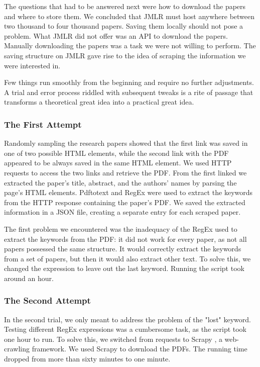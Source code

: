 The questions that had to be answered next were how to download the papers and where to store them. We concluded that JMLR must host anywhere between two thousand to four thousand papers. Saving them locally should not pose a problem. What JMLR did not offer was an API to download the papers. Manually downloading the papers was a task we were not willing to perform. The saving structure on JMLR gave rise to the idea of scraping the information we were interested in. 


Few things run smoothly from the beginning and require no further adjustments. A trial and error process riddled with subsequent tweaks is a rite of passage that transforms a theoretical great idea into a practical great idea.
\subsubsection{The First Attempt}
Randomly sampling the research papers showed that the first link was saved in one of two possible HTML elements, while the second link with the PDF appeared to be always saved in the same HTML element. We used HTTP requests to access the two links and retrieve the PDF. From the first linked we extracted the paper's title, abstract, and the authors' names by parsing the page's HTML elements. Pdftotext \cite{p2t} and RegEx were used to extract the keywords from the HTTP response containing the paper's PDF. We saved the extracted information in a JSON file, creating a separate entry for each scraped paper.


The first problem we encountered was the inadequacy of the RegEx used to extract the keywords from the PDF: it did not work for every paper, as not all papers possessed the same structure. It would correctly extract the keywords from a set of papers, but then it would also extract other text. To solve this, we changed the expression to leave out the last keyword. Running the script took around an hour. 

\subsubsection{The Second Attempt} 
In the second trial, we only meant to address the problem of the "lost" keyword. Testing different RegEx expressions was a cumbersome task, as the script took one hour to run. To solve this, we switched from requests to Scrapy \cite{kouzis2016learning}, a web-crawling framework. We used Scrapy to download the PDFs. The running time dropped from more than sixty minutes to one minute. 


